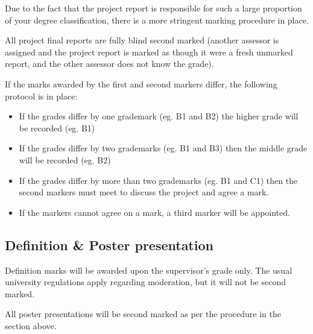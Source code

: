 Due to the fact that the project report is responsible for such a large proportion of your degree classification, there is a more stringent marking procedure in place.

All project final reports are fully blind second marked (another assessor is assigned and the project report is marked as though it were a fresh unmarked report, and the other assessor does not know the grade).

If the marks awarded by the first and second markers differ, the following protocol is in place:

\begin{itemize}
    \item If the grades differ by one grademark (eg. B1 and B2) the higher grade will be recorded (eg. B1)
    \item If the grades differ by two grademarks (eg. B1 and B3) then the middle grade will be recorded (eg. B2)
    \item If the grades differ by more than two grademarks (eg. B1 and C1) then the second markers must meet to discuss the project and agree a mark.
    \item If the markers cannot agree on a mark, a third marker will be appointed.
\end{itemize}

\subsection{Definition \& Poster presentation}

Definition marks will be awarded upon the supervisor's grade only. The usual university regulations apply regarding moderation, but it will not be second marked.

All poster presentations will be second marked as per the procedure in the section above.